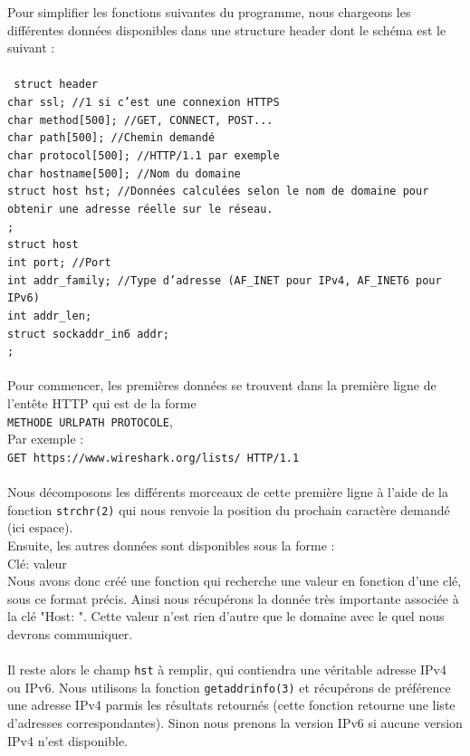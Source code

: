 \documentclass{scrreprt}
\def\code#1{\texttt{#1}}
\let\tab\quad
\begin{document}
Pour simplifier les fonctions suivantes du programme, nous chargeons les différentes données disponibles dans une structure header dont le schéma est le suivant :\\
\\
\code{
  struct header {\\
  \tab  char ssl; //1 si c'est une connexion HTTPS\\
  \tab  char method[500]; //GET, CONNECT, POST...\\
  \tab  char path[500]; //Chemin demandé\\
  \tab  char protocol[500]; //HTTP/1.1 par exemple\\
  \tab  char hostname[500]; //Nom du domaine\\
  \tab  struct host hst; //Données calculées selon le nom de domaine pour obtenir une adresse réelle sur le réseau.\\
  };\\
  struct host {\\
  \tab  int port; //Port\\
  \tab  int addr_family; //Type d'adresse (AF_INET pour IPv4, AF_INET6 pour IPv6)\\
  \tab  int addr_len;\\
  \tab  struct sockaddr_in6 addr;\\
  };\\
}
\\
Pour commencer, les premières données se trouvent dans la première ligne de l'entête HTTP qui est de la forme\\
\code{METHODE URLPATH PROTOCOLE},\\
Par exemple :\\
\code{GET https://www.wireshark.org/lists/ HTTP/1.1}\\
\\
Nous décomposons les différents morceaux de cette première ligne à l'aide de la fonction \code{strchr(2)} qui nous renvoie la position du prochain caractère demandé (ici espace).\\
Ensuite, les autres données sont disponibles sous la forme :\\
Clé: valeur\\
Nous avons donc créé une fonction qui recherche une valeur en fonction d'une clé, sous ce format précis. Ainsi nous récupérons la donnée très importante associée à la clé "Host: ". Cette valeur n'est rien d'autre que le domaine avec le quel nous devrons communiquer.\\
\\
Il reste alors le champ \code{hst} à remplir, qui contiendra une véritable adresse IPv4 ou IPv6. Nous utilisons la fonction \code{getaddrinfo(3)} et récupérons de préférence une adresse IPv4 parmis les résultats retournés (cette fonction retourne une liste d'adresses correspondantes). Sinon nous prenons la version IPv6 si aucune version IPv4 n'est disponible.
\end{document}
